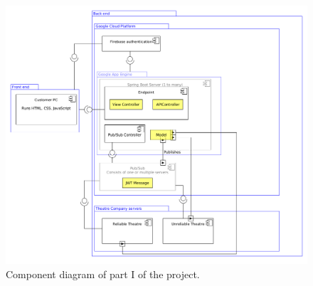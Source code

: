 \documentclass{ds-report}
\begin{document}
	\begin{figure}
		\begin{center}
			\includegraphics[width=\linewidth]{./diagrams/ComponentDiagram}
		\end{center}
	\caption{Component diagram of part I of the project.}
	\label{fig:component}
	\end{figure}

	
\end{document}
